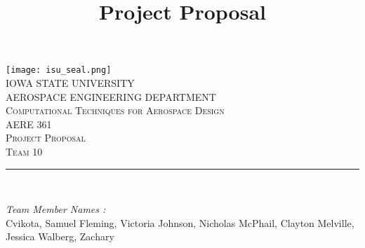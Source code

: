 \documentclass[12pt]{article}
\begin{document}
\title{Project Proposal}

\begin{titlepage}
	\centering
    \vspace*{0.5 cm}
    \texttt{[image: isu\_seal.png]}\\[1.0 cm]	%
    \textsc{\LARGE IOWA STATE UNIVERSITY}\\[2.0 cm]
    \textsc{\large AEROSPACE ENGINEERING DEPARTMENT}\\[0.2 cm]
    \textsc{\large Computational Techniques for Aerospace Design}\\[0.2 cm]
	\textsc{\Large AERE 361}\\[0.5 cm]				%
	\textsc{\Large Project Proposal}\\[0.2 cm]
	\textsc{\Large Team 10}\\[0.2 cm]
	\rule{\linewidth}{0.2 mm} \\[0.4 cm]
	
	
	\begin{minipage}{0.8\textwidth}
		
			\begin{flushleft} 
			\emph{Team Member Names :} \\
			Cvikota, Samuel\linebreak
			Fleming, Victoria\linebreak
			Johnson, Nicholas\linebreak
			McPhail, Clayton\linebreak
			Melville, Jessica\linebreak
			Walberg, Zachary\linebreak
			
		\end{flushleft}
	\end{minipage}\\[2 cm]
	
	\vfill
	
\end{titlepage}

\tableofcontents
\pagebreak
\end{document}
